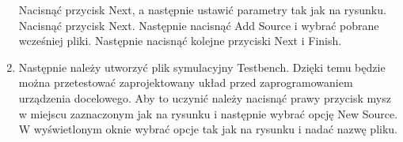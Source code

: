 \documentclass{article}
\begin{document}
\begin{enumerate}
\begin{minipage}[t]{\linewidth}
          \medskip
          Nacisnąć przycisk Next, a następnie ustawić parametry tak jak na rysunku.
	Nacisnąć przycisk Next. Następnie nacisnąć Add Source i wybrać pobrane wcześniej pliki. Następnie nacisnąć kolejne przyciski Next i Finish.
    \end{minipage}
\item Następnie należy utworzyć plik symulacyjny Testbench. Dzięki temu będzie można przetestować zaprojektowany układ przed zaprogramowaniem urządzenia docelowego. Aby to uczynić należy nacisnąć prawy przycisk mysz w miejscu zaznaczonym jak na rysunku i następnie wybrać opcję New Source. W wyświetlonym oknie wybrać opcje tak jak na rysunku i nadać nazwę pliku. \\ \begin{minipage}[t]{\linewidth}
          \raggedright


\end{minipage}
\end{enumerate}
\end{document}
